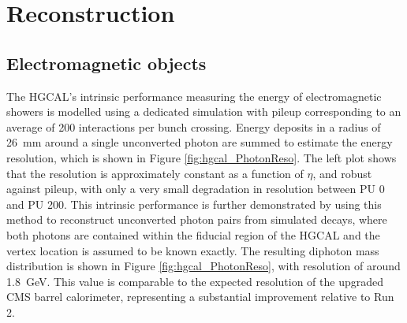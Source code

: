 \section{Reconstruction}

\subsection{Electromagnetic objects}

The HGCAL's intrinsic performance measuring the energy of electromagnetic showers is modelled using a dedicated simulation with pileup corresponding to an average of 200 interactions per bunch crossing. 
Energy deposits in a radius of \SI{26}{mm} around a single unconverted photon are summed to estimate the energy resolution, which is shown in Figure \ref{fig:hgcal_PhotonReso}.
The left plot shows that the resolution is approximately constant as a function of $\eta$, and robust against pileup, with only a very small degradation in resolution between PU 0 and PU 200.
This intrinsic performance is further demonstrated by using this method to reconstruct unconverted photon pairs from simulated \Hgg decays, 
where both photons are contained within the fiducial region of the HGCAL and the vertex location is assumed to be known exactly. 
The resulting diphoton mass distribution is shown in Figure \ref{fig:hgcal_PhotonReso}, with resolution of around \SI{1.8}{GeV}.
This value is comparable to the expected resolution of the upgraded CMS barrel calorimeter, representing a substantial improvement relative to Run 2. 


